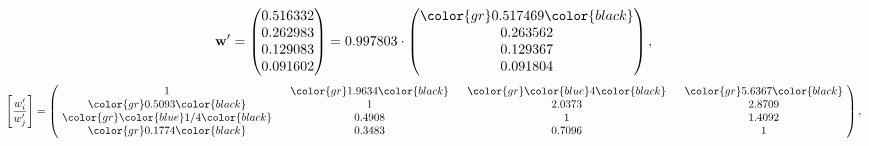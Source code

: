 \begin{example}
\begin{equation*}
\mathbf{w}^{\prime} =
\begin{pmatrix}
0.516332\\
0.262983\\
0.129083\\
0.091602
\end{pmatrix} =
0.997803\cdot
\begin{pmatrix}
\color{gr} 0.517469\color{black} \\
0.263562\\
0.129367\\
0.091804
\end{pmatrix},
\end{equation*}
\begin{equation*}
\left[ \frac{{w}^{\prime}_i}{{w}^{\prime}_j} \right] =
\begin{pmatrix}
$\,\,$ 1 $\,\,$ & $\,\,$\color{gr} 1.9634\color{black} $\,\,$ & $\,\,$\color{gr} \color{blue} 4\color{black} $\,\,$ & $\,\,$\color{gr} 5.6367\color{black} $\,\,$ \\
$\,\,$\color{gr} 0.5093\color{black} $\,\,$ & $\,\,$ 1 $\,\,$ & $\,\,$2.0373$\,\,$ & $\,\,$2.8709  $\,\,$ \\
$\,\,$\color{gr} \color{blue}  1/4\color{black} $\,\,$ & $\,\,$0.4908$\,\,$ & $\,\,$ 1 $\,\,$ & $\,\,$1.4092 $\,\,$ \\
$\,\,$\color{gr} 0.1774\color{black} $\,\,$ & $\,\,$0.3483$\,\,$ & $\,\,$0.7096$\,\,$ & $\,\,$ 1  $\,\,$ \\
\end{pmatrix},
\end{equation*}
\end{example}
\newpage
